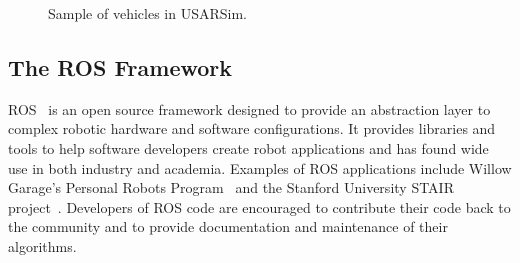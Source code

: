 \begin{figure}[t!]
\centering
{}\qquad
{}\qquad
{}\qquad
{}
\caption{Sample of vehicles in USARSim.}
\end{figure}

\subsection*{The ROS Framework}
ROS~\cite{ROSWeb} is an open source framework designed to provide an abstraction layer to complex robotic hardware and software configurations. It provides libraries and tools to help software developers create robot applications and has found wide use in both industry and academia. Examples of ROS applications include
Willow Garage's Personal Robots Program~\cite{WYOBEK.ICRA.2008} and the Stanford University STAIR project~\cite{QUIGLEY.AAAI.2007}. Developers of ROS code are encouraged to
contribute their code back to the community and to provide documentation and maintenance of their algorithms.

